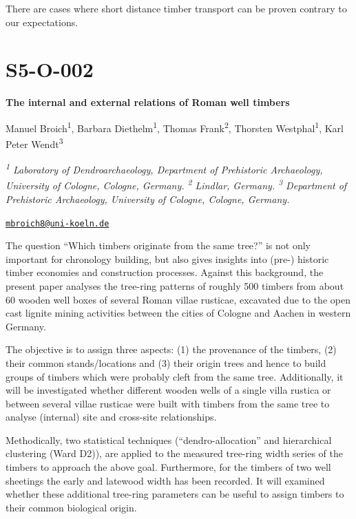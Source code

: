 \documentclass[
]{book}
\begin{document}
There are cases where short distance timber transport can be proven contrary to our expectations.

\hypertarget{s5-o-002}{%
\section*{S5-O-002}\label{s5-o-002}}

\textbf{The internal and external relations of Roman well timbers}

Manuel Broich\textsuperscript{1}, Barbara Diethelm\textsuperscript{1}, Thomas Frank\textsuperscript{2}, Thorsten Westphal\textsuperscript{1}, Karl Peter Wendt\textsuperscript{3}

\emph{\textsuperscript{1} Laboratory of Dendroarchaeology, Department of Prehistoric Archaeology, University of Cologne, Cologne, Germany. \textsuperscript{2} Lindlar, Germany. \textsuperscript{3} Department of Prehistoric Archaeology, University of Cologne, Cologne, Germany.}

\href{mailto:mbroich8@uni-koeln.de}{\nolinkurl{mbroich8@uni-koeln.de}}

The question ``Which timbers originate from the same tree?'' is not only important for chronology building, but also gives insights into (pre-) historic timber economies and construction processes. Against this background, the present paper analyses the tree-ring patterns of roughly 500 timbers from about 60 wooden well boxes of several Roman villae rusticae, excavated due to the open cast lignite mining activities between the cities of Cologne and Aachen in western Germany.

The objective is to assign three aspects: (1) the provenance of the timbers, (2) their common stands/locations and (3) their origin trees and hence to build groups of timbers which were probably cleft from the same tree. Additionally, it will be investigated whether different wooden wells of a single villa rustica or between several villae rusticae were built with timbers from the same tree to analyse (internal) site and cross-site relationships.

Methodically, two statistical techniques (``dendro-allocation'' and hierarchical clustering (Ward D2)), are applied to the measured tree-ring width series of the timbers to approach the above goal. Furthermore, for the timbers of two well sheetings the early and latewood width has been recorded. It will examined whether these additional tree-ring parameters can be useful to assign timbers to their common biological origin.
\end{document}
